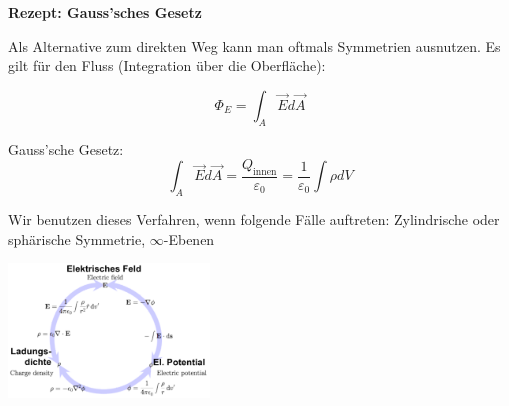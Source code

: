 \begin{tcolorbox}
    \footnotesize{
    \textbf{Rezept: Gauss'sches Gesetz}
    
    Als Alternative zum direkten Weg kann man oftmals Symmetrien ausnutzen. Es gilt für den Fluss (Integration über die Oberfläche): 

    \begin{equation*}
        \Phi_E = \int_A \Vec{E} d\Vec{A}
    \end{equation*}
    
    \noindent Gauss'sche Gesetz:
    \begin{equation*}
        \int_A \Vec{E}d\Vec{A} = \frac{Q_{\mathrm{innen}}}{\varepsilon_0} = \frac{1}{\varepsilon_0} \int\rho dV
    \end{equation*}
    
    Wir benutzen dieses Verfahren, wenn folgende Fälle auftreten: Zylindrische oder sphärische Symmetrie, $\infty$-Ebenen}
\end{tcolorbox}{}

\begin{center}
    \includegraphics[width=0.4\textwidth]{Figures/Leiter_Isolatoren.png}
\end{center}

